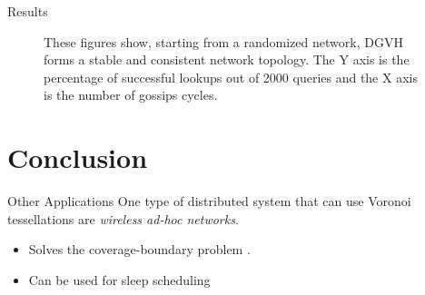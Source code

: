 \documentclass[8pt]{beamer}
\begin{document}
\begin{frame}{Results}
\begin{figure}
 	\caption{These figures show, starting from a randomized network, DGVH forms a stable and consistent network topology.
 		The Y axis is the percentage of successful lookups out of 2000 queries and the X axis is the number of gossips cycles.}
 	
 \end{figure}
	


\end{frame}	

\section{Conclusion}
	\begin{frame}{Other Applications}
		One type of distributed system that can use Voronoi tessellations are \textit{wireless ad-hoc networks}.
		\begin{itemize}
			\item Solves the coverage-boundary problem \cite{carbunar2004distributed}.
			\item Can be used for sleep scheduling \cite{chen2008voronoi}
		\end{itemize}
	\end{frame}	
	



	
\end{document}
